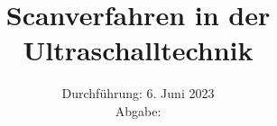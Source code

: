 

\subject{\texorpdfstring{\vspace{2ex}}{}US1\texorpdfstring{\vspace{-2ex}}{}} %
\title{Scanverfahren in der Ultraschalltechnik} %
\date{
	Durchführung: 6. Juni 2023 %
	\\ Abgabe:%
}




\maketitle
\thispagestyle{empty}


\tableofcontents
\newpage







\printbibliography{}

\newpage



